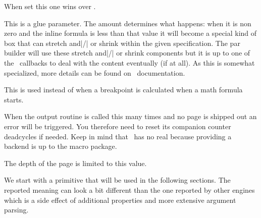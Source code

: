 \startnewprimitive[title={\prm {mathsurroundskip}}]

When set this one wins over .

\stopnewprimitive

\startnewprimitive[title={\prm {maththreshold}}]

This is a glue parameter. The amount determines what happens: when it is non zero
and the inline formula is less than that value it will become a special kind of
box that can stretch and|/| or shrink within the given specification. The par
builder will use these stretch and|/| or shrink components but it is up to one of
the \LUA\ callbacks to deal with the content eventually (if at all). As this is
somewhat specialized, more details can be found on \CONTEXT\ documentation.

\stopnewprimitive

\startnewprimitive[title={\prm {mathtolerance}}]

This is used instead of  when a breakpoint is calculated when a
math formula starts.

\stopnewprimitive

\startoldprimitive[title={\prm {maxdeadcycles}}]

When the output routine is called this many times and no page is shipped out an
error will be triggered. You therefore need to reset its companion counter \prm
{deadcycles} if needed. Keep in mind that \LUAMETATEX\ has no real 
because providing a backend is up to the macro package.

\stopoldprimitive

\startoldprimitive[title={\prm {maxdepth}}]

The depth of the page is limited to this value.

\stopoldprimitive

\startoldprimitive[title={\prm {meaning}}]

We start with a primitive that will be used in the following sections. The
reported meaning can look a bit different than the one reported by other engines
which is a side effect of additional properties and more extensive argument
parsing.

\startbuffer
\tolerant\permanent\protected\gdef\foo[#1]#*[#2]{(#1)(#2)} \meaning\foo
\stopbuffer

\typebuffer \getbuffer

\stopoldprimitive

\startnewprimitive[title={\prm {meaningasis}}]

